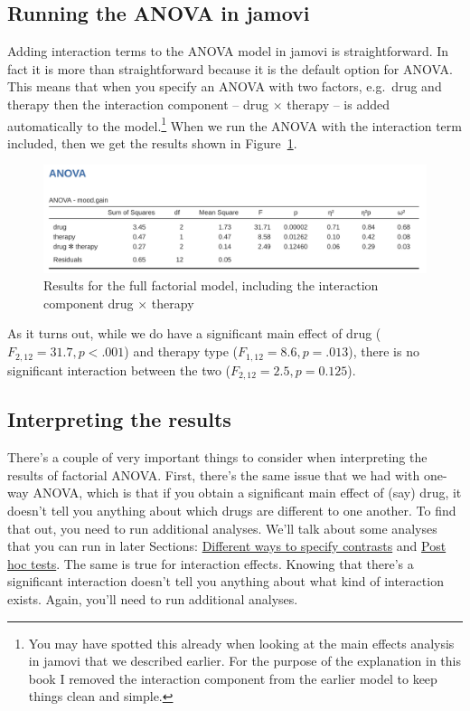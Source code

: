 \documentclass[
  a4paper,
]{book}
\begin{document}
\hypertarget{running-the-anova-in-jamovi}{%
\subsection{Running the ANOVA in
jamovi}\label{running-the-anova-in-jamovi}}

Adding interaction terms to the ANOVA model in jamovi is
straightforward. In fact it is more than straightforward because it is
the default option for ANOVA. This means that when you specify an ANOVA
with two factors, e.g.~drug and therapy then the interaction component
-- drug \(\times\) therapy -- is added automatically to the
model.\footnote{You may have spotted this already when looking at the
  main effects analysis in jamovi that we described earlier. For the
  purpose of the explanation in this book I removed the interaction
  component from the earlier model to keep things clean and simple.}
When we run the ANOVA with the interaction term included, then we get
the results shown in Figure~\ref{fig-fig14-7}.

\begin{figure}

\includegraphics[width=1\textwidth,height=\textheight]{images/fig14-7.png} \hfill{}

\caption{\label{fig-fig14-7}Results for the full factorial model,
including the interaction component drug \(\times\) therapy}

\end{figure}

As it turns out, while we do have a significant main effect of drug
(\(F_{2,12} = 31.7, p < .001\)) and therapy type
(\(F_{1,12} = 8.6, p = .013\)), there is no significant interaction
between the two (\(F_{2,12} = 2.5, p = 0.125\)).

\hypertarget{interpreting-the-results}{%
\subsection{Interpreting the results}\label{interpreting-the-results}}

There's a couple of very important things to consider when interpreting
the results of factorial ANOVA. First, there's the same issue that we
had with one-way ANOVA, which is that if you obtain a significant main
effect of (say) drug, it doesn't tell you anything about which drugs are
different to one another. To find that out, you need to run additional
analyses. We'll talk about some analyses that you can run in later
Sections:
\protect\hyperlink{different-ways-to-specify-contrasts}{Different ways
to specify contrasts} and \protect\hyperlink{sec-Post-hoc-tests}{Post
hoc tests}. The same is true for interaction effects. Knowing that
there's a significant interaction doesn't tell you anything about what
kind of interaction exists. Again, you'll need to run additional
analyses.
\end{document}
